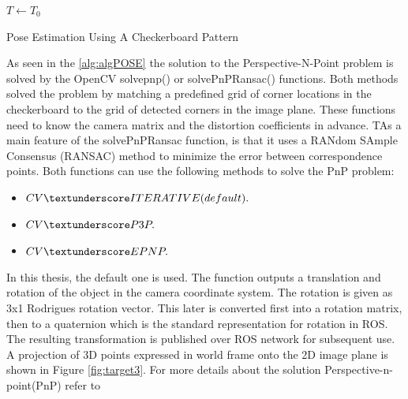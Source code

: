 \begin{algorithm}[H]
\SetAlgoLined
{}
 $T \leftarrow T_{0}$  \;
 {
}
\caption{Pose Estimation Using A Checkerboard Pattern}
\label{alg:algPOSE}
\end{algorithm}

As seen in the \ref{alg:algPOSE} the solution to the Perspective-N-Point problem is solved by the OpenCV solvepnp() or solvePnPRansac() functions. Both methods solved the problem by matching a predefined grid of corner locations in the checkerboard to the grid of detected corners in the image plane. These functions need to know the camera matrix and the distortion coefficients in advance. TAs a main feature of the solvePnPRansac function, is that it uses a RANdom SAmple Consensus (RANSAC) method to minimize the error between correspondence points. Both functions can use the following methods to solve the PnP problem:

\begin{itemize}
\item $CV \textunderscore ITERATIVE (default).$
\item $CV \textunderscore P3P.$
\item $CV \textunderscore EPNP.$
\end{itemize}

In this thesis, the default one is used. The function outputs a translation and rotation of the object in the camera coordinate system. The rotation is given as 3x1 Rodrigues rotation vector. This later is converted first
into a rotation matrix, then to a quaternion which is the
standard representation for rotation in ROS. The resulting transformation is published over ROS network for subsequent use. A projection of 3D points expressed in world frame onto the 2D image plane is shown in Figure \ref{fig:target3}. For more details about the solution Perspective-n-point(PnP) refer to \cite{pnp}


